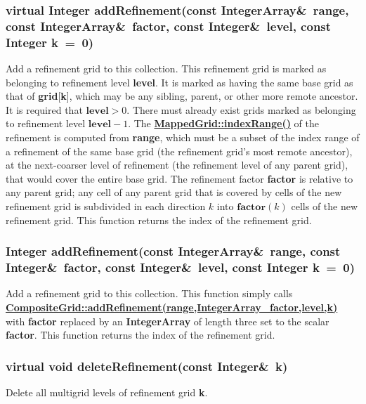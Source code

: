 \documentclass{article}
\begin{document}
  \subsubsection{virtual Integer addRefinement(const IntegerArray\&~range, const IntegerArray\&~factor,
     const Integer\&~level, const Integer k~=~0)}
  \label{CompositeGrid::addRefinement(range,IntegerArray_factor,level,k)}
    Add a refinement grid to this collection.  This refinement grid is marked as belonging to refinement level \textbf{level}.
    It is marked as having the same base grid as that of \textbf{grid}[\textbf{k}], which may be any sibling, parent, or
    other more remote ancestor.  It is required that $\textbf{level}>0$.  There must already exist grids marked as belonging
    to refinement level $\textbf{level}-1$.
    The {\bf{}\hyperref{indexRange()}{indexRange() \rm(\S}{)}{MappedGrid::indexRange()}} of the refinement is computed from \textbf{range},
    which must be a subset of the index range of a refinement of the same base grid (the refinement grid's most remote ancestor),
    at the next-coarser level of refinement (the refinement level of any parent grid), that would cover the entire base grid.
    The refinement factor \textbf{factor} is relative to any parent grid; any cell of any parent grid that is covered by cells
    of the new refinement grid is subdivided in each direction $k$ into $\textbf{factor}(k)$ cells of the new refinement grid.
    This function returns the index of the refinement grid.

  \subsubsection{Integer addRefinement(const IntegerArray\&~range, const Integer\&~factor,
     const Integer\&~level, const Integer k~=~0)}
  \label{CompositeGrid::addRefinement(range,Integer_factor,level,k)}
    Add a refinement grid to this collection.  This function simply calls
    {\bf{}\hyperref{addRefinement()}{addRefinement() \rm(\S}{)}{CompositeGrid::addRefinement(range,IntegerArray_factor,level,k)}}
    with \textbf{factor} replaced by an \textbf{IntegerArray} of length three set to the scalar \textbf{factor}.
    This function returns the index of the refinement grid.

  \subsubsection{virtual void deleteRefinement(const Integer\&~k)}
  \label{CompositeGrid::deleteRefinement(k)}
    Delete all multigrid levels of refinement grid \textbf{k}.
\end{document}
